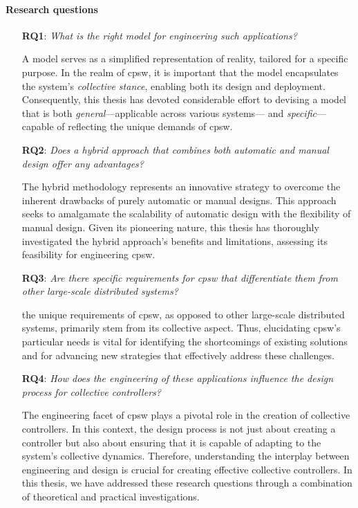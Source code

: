 \begin{refsection}
\paragraph*{Research questions}
\begin{itemize}
    \item[\textbf{RQ1}:] \emph{What is the right model for engineering such applications?}

    A model serves as a simplified representation of reality, tailored for a specific purpose. 
     In the realm of \ac{cpsw}, it is important that the model encapsulates the system's \emph{collective stance}, enabling both its design and deployment. 
     Consequently, this thesis has devoted considerable effort to devising a model that is both \emph{general}—applicable across various systems—
     and \emph{specific}—capable of reflecting the unique demands of \ac{cpsw}.
    \item[\textbf{RQ2}:] \emph{Does a hybrid approach that combines both automatic and manual design offer any advantages?} 
    
    The hybrid methodology represents an innovative strategy to overcome the inherent drawbacks of purely automatic or manual designs. 
     This approach seeks to amalgamate the scalability of automatic design with the flexibility of manual design. 
     Given its pioneering nature, this thesis has thoroughly investigated the hybrid approach's benefits and limitations, assessing its feasibility for engineering \ac{cpsw}.
    \item[\textbf{RQ3}:] \emph{Are there specific requirements for \ac{cpsw} that differentiate them from other large-scale distributed systems?}
    
    the unique requirements of \ac{cpsw}, as opposed to other large-scale distributed systems, primarily stem from its collective aspect. 
     Thus, elucidating \ac{cpsw}'s particular needs is vital for identifying 
     the shortcomings of existing solutions and for advancing new strategies that effectively address these challenges.
    \item[\textbf{RQ4}:] \emph{How does the engineering of these applications influence the design process for collective controllers?}
    
    The engineering facet of \ac{cpsw} plays a pivotal role in the creation of collective controllers. 
    In this context, the design process is not just about creating a controller but also about ensuring that it is capable of adapting to the system's collective dynamics.
    Therefore, understanding the interplay between engineering and design is crucial for creating effective collective controllers.
    In this thesis, we have addressed these research questions through a combination of theoretical and practical investigations.
\end{itemize}


\end{refsection}
